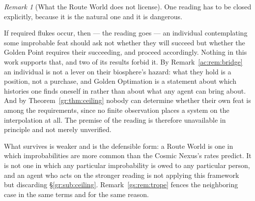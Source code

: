 \documentclass[11pt]{article}
\numberwithin{equation}{section}
\theoremstyle{plain}
\theoremstyle{definition}
\theoremstyle{remark}
\newtheorem{remark}[theorem]{Remark}
\begin{document}
\begin{remark}[What the Route World does not license]
\label{gc:rem:routefence}
One reading has to be closed explicitly, because it is the natural one
and it is dangerous.

If required flukes occur, then --- the reading goes --- an individual
contemplating some improbable feat should ask not whether they will
succeed but whether the Golden Point requires their succeeding, and
proceed accordingly. Nothing in this work supports that, and two of its
results forbid it. By Remark~\ref{ac:rem:bridge} an individual is not a
lever on their biosphere's hazard: what they hold is a position, not a
purchase, and Golden Optimation is a statement about which histories one
finds oneself in rather than about what any agent can bring about. And
by Theorem~\ref{gr:thm:ceiling} nobody can determine whether their own
feat is among the requirements, since no finite observation places a
system on the interpolation at all. The premise of the reading is
therefore unavailable in principle and not merely unverified.

What survives is weaker and is the defensible form: a Route World is one in
which improbabilities are more common than the Cosmic Nexus's rates
predict. It is not one in which any particular improbability is owed to
any particular person, and an agent who acts on the stronger reading is
not applying this framework but discarding
\S\ref{gr:sub:ceiling}. Remark~\ref{gs:rem:trope} fences the neighboring
case in the same terms and for the same reason.
\end{remark}
\end{document}
